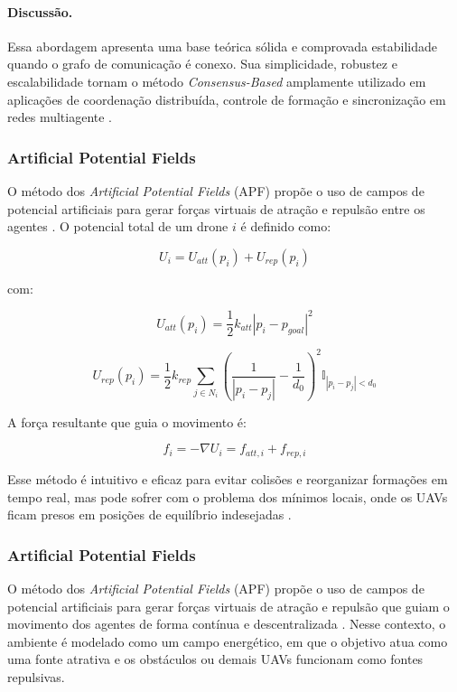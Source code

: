 \documentclass[portuguese]{sbcreviews-2025}%
\begin{document}
\paragraph{Discussão.}
Essa abordagem apresenta uma base teórica sólida e comprovada estabilidade quando o grafo de comunicação é conexo. Sua simplicidade, robustez e escalabilidade tornam o método \textit{Consensus-Based} amplamente utilizado em aplicações de coordenação distribuída, controle de formação e sincronização em redes multiagente \cite{olfati2007consensus, ren2008distributed}.



\subsubsection{Artificial Potential Fields}

O método dos \textit{Artificial Potential Fields} (APF) propõe o uso de campos de potencial artificiais para gerar forças virtuais de atração e repulsão entre os agentes \cite{bu2024advancement, ouyang2023formation}. O potencial total de um drone $i$ é definido como:

\[
U_i = U_{att}(p_i) + U_{rep}(p_i)
\]

com:

\[
U_{att}(p_i) = \frac{1}{2} k_{att} |p_i - p_{goal}|^2
\]

\[
U_{rep}(p_i) = \frac{1}{2} k_{rep} \sum_{j \in N_i} \left( \frac{1}{|p_i - p_j|} - \frac{1}{d_0} \right)^2 \mathbb{I}_{|p_i - p_j| < d_0}
\]

A força resultante que guia o movimento é:

\[
f_i = -\nabla U_i = f_{att,i} + f_{rep,i}
\]

Esse método é intuitivo e eficaz para evitar colisões e reorganizar formações em tempo real, mas pode sofrer com o problema dos mínimos locais, onde os UAVs ficam presos em posições de equilíbrio indesejadas \cite{bu2024advancement, ouyang2023formation}.


\subsubsection{Artificial Potential Fields}

O método dos \textit{Artificial Potential Fields} (APF) propõe o uso de campos de potencial artificiais para gerar forças virtuais de atração e repulsão que guiam o movimento dos agentes de forma contínua e descentralizada \cite{khatib1986real, bu2024advancement, ouyang2023formation}. Nesse contexto, o ambiente é modelado como um campo energético, em que o objetivo atua como uma fonte atrativa e os obstáculos ou demais UAVs funcionam como fontes repulsivas.
\end{document}
